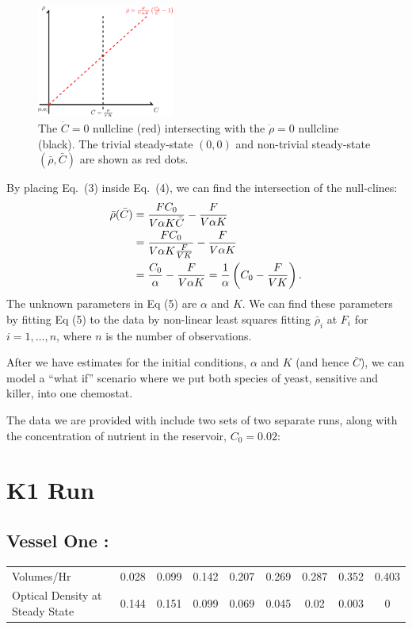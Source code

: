 \begin{multicols}{2}
\begin{figure}[H]
  \centering
    \includegraphics[width=0.40\textwidth]{images/drawing.png}
  \caption{\footnotesize The $\dot{C} = 0$ nullcline (red) intersecting with the $\dot{\rho} = 0$ nullcline (black).  The trivial steady-state $(0,0)$ and non-trivial steady-state $(\bar{\rho}, \bar{C})$ are shown as red dots.}
\end{figure}
\vfill
\columnbreak
By placing Eq.\ (3) inside Eq.\ (4), we can find the intersection of the null-clines:
\begin{align}
  \bar{\rho}(\bar{C}) &= \frac{FC_0}{V \alpha K \bar{C}} - \frac{F}{V \alpha K}  \notag \\
  &= \frac{FC_0}{V \alpha K \frac{F}{VK}} - \frac{F}{V \alpha K} \notag \\
  &= \frac{C_0}{\alpha} - \frac{F}{V \alpha K} = \frac{1}{\alpha} \left( C_0 - \frac{F}{VK} \right).
\end{align}
The unknown parameters in Eq (5) are $\alpha$ and $K$.  We can find these parameters by fitting Eq (5) to the data by non-linear least squares fitting $\bar{\rho}_i$ at $F_i$ for $i = 1,\ldots,n$, where $n$ is the number of observations.
\end{multicols}

After we have estimates for the initial conditions, $\alpha$ and $K$ (and hence $\bar{C}$), we can model a ``what if'' scenario where we put both species of yeast, sensitive and killer, into one chemostat.

\newpage

The data we are provided with include two sets of two separate runs, along with the concentration of nutrient in the reservoir, $C_0 = 0.02$:
\section{K1 Run}
\subsection*{Vessel One :}
\begin{center}
\begin{tabular}{l|cccccccc}
  Volumes/Hr & 0.028 & 0.099 & 0.142 & 0.207 & 0.269 & 0.287 & 0.352 & 0.403 \\
  Optical Density at Steady State & 0.144 & 0.151 & 0.099 & 0.069 & 0.045 & 0.02 & 0.003 & 0 \\
\end{tabular}
\end{center}

